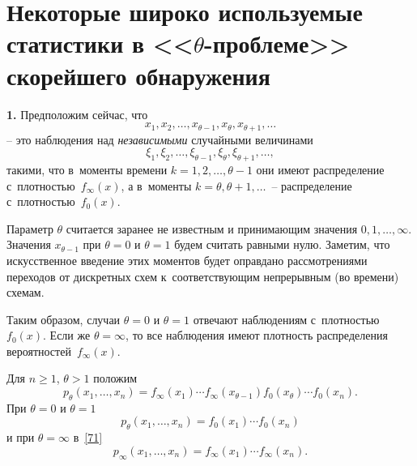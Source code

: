 \section{Некоторые широко используемые статистики в <<$\theta$-проблеме>> скорейшего 
обнаружения}\label{sec-4}

\textbf{1.} Предположим сейчас, что
\[
x_1,x_2,\ldots,x_{\theta-1},x_{\theta},x_{\theta+1},\ldots
\]
-- это наблюдения над \textit{независимыми} случайными величинами
\[
\xi_1,\xi_2,\ldots,\xi_{\theta-1},\xi_{\theta},\xi_{\theta+1},\ldots,
\]
такими, что в~моменты времени $k=1,2,\ldots,\theta-1$ они имеют
распределение с~плотностью~$f_\infty(x)$, а в~моменты
$k=\theta,\theta+1,\ldots$~-- распределение с~плотностью~$f_0(x)$.

Параметр $\theta$ считается заранее не известным и принимающим
значения $0,1,\ldots,\infty$. Значения $x_{\theta-1}$ при
$\theta=0$ и $\theta=1$ будем считать равными нулю. Заметим, что
искусственное введение этих моментов будет оправдано
рассмотрениями переходов от дискретных схем к~соответствующим
непрерывным (во времени) схемам.

Таким образом, случаи $\theta=0$ и $\theta=1$ отвечают наблюдениям
с~плотностью~$f_{0}(x)$. Если же $\theta=\infty$, то все
наблюдения имеют плотность распределения
вероятностей~$f_{\infty}(x)$.

Для $n\ge1$, $\theta>1$ положим
\begin{equation}
\label{71}%
p_{\theta}(x_1,\ldots,x_n)
    =f_{\infty}(x_1)\cdots f_{\infty}(x_{\theta-1})
    f_0(x_{\theta})\cdots f_0(x_n).
\end{equation}
При $\theta=0$ и $\theta=1$
\begin{equation}
\label{72}%
p_{\theta}(x_1,\ldots,x_n)
    =f_{0}(x_1)\cdots f_{0}(x_n)
\end{equation}
и при $\theta=\infty$ в~\eqref{71}
\begin{equation}
\label{73}%
p_{\infty}(x_1,\ldots,x_n)
    =f_{\infty}(x_1)\cdots f_{\infty}(x_n).
\end{equation}

